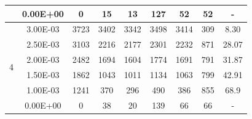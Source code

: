 \begin{table}[H]
{\begin{tabular}{|c|c|c|c|c|c|c|c|c|}
                               & 0.00E+00         & 0         & 15                                                         & 13                                                        & 127                                                       & 52      & 52     & -                                                                  \\ \hline
            \multirow{6}{*}{4} & 3.00E-03         & 3723      & 3402                                                       & 3342                                                      & 3498                                                      & 3414    & 309    & 8.30                                                               \\ \cline{2-9}
                               & 2.50E-03         & 3103      & 2216                                                       & 2177                                                      & 2301                                                      & 2232    & 871    & 28.07                                                              \\ \cline{2-9}
                               & 2.00E-03         & 2482      & 1694                                                       & 1604                                                      & 1774                                                      & 1691    & 791    & 31.87                                                              \\ \cline{2-9}
                               & 1.50E-03         & 1862      & 1043                                                       & 1011                                                      & 1134                                                      & 1063    & 799    & 42.91                                                              \\ \cline{2-9}
                               & 1.00E-03         & 1241      & 370                                                        & 296                                                       & 490                                                       & 386     & 855    & 68.9                                                               \\ \cline{2-9}
                               & 0.00E+00         & 0         & 38                                                         & 20                                                        & 139                                                       & 66      & 66     & -                                                                  \\ \hline

\end{tabular}}
\end{table}

